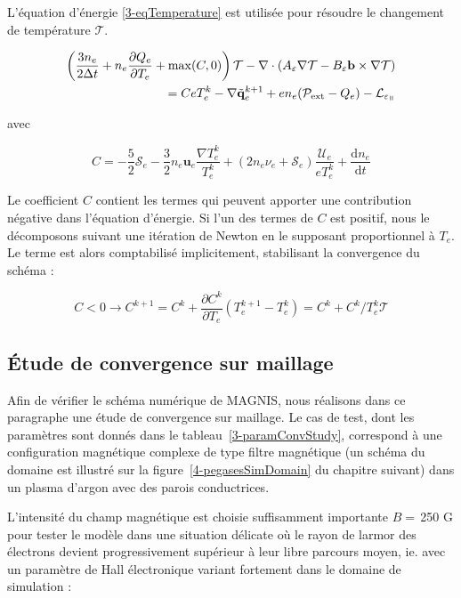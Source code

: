 \begin{refsection}
L'équation d'énergie \eqref{3-eqTemperature} est utilisée pour résoudre le
changement de température $\mathcal T$. 

\begin{equation}
\label{3-eqTemperature2}
\begin{split}
\left(\frac{3n_e}{2\Delta
t}+n_e\frac{\partial Q_e}{\partial T_e}+\max(C,0)\right)\mathcal T
-\nabla\cdot\left(A_\varepsilon\nabla\mathcal T- B_\varepsilon\mathbf
b\times\nabla\mathcal T\right)\\ =  C eT_e^k -\nabla\tilde{\mathbf q}_e^{k+1}+
en_e(\mathcal{P}_\text{ext}-Q_e)-\mathcal L_{\varepsilon_\para}
\end{split}\end{equation}

avec 

\begin{equation*}C=-\frac{5}{2}\mathcal S_e-\frac{3}{2}n_e\mathbf
u_e\frac{\nabla
T_e^k}{T_e^k}+(2n_e\nu_e+\mathcal{S}_e)\frac{\mathcal{U}_e}{eT_e^k} +\frac{\text{d} n_e}{\text{d} t}
\end{equation*}

Le coefficient $C$ contient les termes qui peuvent apporter une contribution
négative dans l'équation d'énergie. Si l'un des
termes de $C$ est positif, nous le décomposons suivant une itération de
Newton en le supposant proportionnel à $T_e$. Le terme est alors comptabilisé
implicitement, stabilisant la convergence du schéma
\parencite{HagelaarImpl} :

\begin{equation*}
	C<0\rightarrow C^{k+1}=C^{k}+\frac{\partial C^k}{\partial
	T_e}(T_e^{k+1}-T_e^k)=C^{k}+ C^k/T_e^k\mathcal T
\end{equation*}

\subsection{Étude de convergence sur maillage} 
Afin de vérifier le schéma numérique de MAGNIS, nous réalisons dans ce
paragraphe une étude de convergence sur maillage. Le cas de test, dont les paramètres sont donnés dans le
tableau~\ref{3-paramConvStudy}, correspond à une configuration magnétique
complexe de type filtre magnétique (un schéma du domaine est illustré sur la
figure~\ref{4-pegasesSimDomain} du chapitre suivant) dans un plasma
d'argon avec des parois conductrices.

L'intensité du champ magnétique est choisie suffisamment importante $B=\,$250 G
pour tester le modèle dans une situation délicate où le rayon de larmor des
électrons devient progressivement supérieur à leur libre parcours moyen, ie.
avec un paramètre de Hall électronique variant fortement dans le domaine de
simulation :


\end{refsection}

